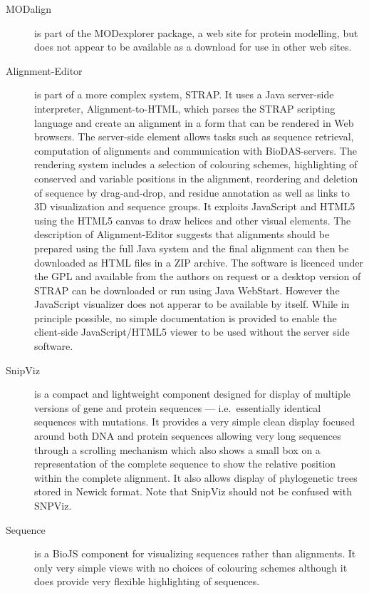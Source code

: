 \documentclass[a4]{article}
\begin{document}
\begin{description}
\item[MODalign] is part of the MODexplorer
  package\cite{kosinski:2013}, a web site for protein modelling, but
  does not appear to be available as a download for use in other web
  sites.
\item[Alignment-Editor] is part of a more complex system, STRAP. It
  uses a Java server-side interpreter,
  Alignment-to-HTML\cite{gille:2014}, which parses the STRAP scripting
  language and create an alignment in a form that can be rendered in
  Web browsers. The server-side element allows tasks such as sequence
  retrieval, computation of alignments and communication with
  BioDAS-servers. The rendering system includes a selection of
  colouring schemes, highlighting of conserved and variable positions
  in the alignment, reordering and deletion of sequence by
  drag-and-drop, and residue annotation as well as links to 3D
  visualization and sequence groups. It exploits JavaScript and HTML5
  using the HTML5 canvas to draw helices and other visual elements.
  The description of Alignment-Editor\cite{gille:2014aa} suggests that
  alignments should be prepared using the full Java system and the
  final alignment can then be downloaded as HTML files in a ZIP
  archive. The software is licenced under the GPL and available from
  the authors on request or a desktop version of STRAP can be
  downloaded or run using Java WebStart. However the JavaScript
  visualizer does not apperar to be available by itself. While in
  principle possible, no simple documentation is provided to enable
  the client-side JavaScript/HTML5 viewer to be used without the
  server side software.
\item[SnipViz] is a compact and lightweight component designed for
  display of multiple versions of gene and protein sequences --- i.e.\
  essentially identical sequences with mutations.  It provides a very
  simple clean display focused around both DNA and protein sequences
  allowing very long sequences through a scrolling mechanism which
  also shows a small box on a representation of the complete sequence
  to show the relative position within the complete alignment.  It
  also allows display of phylogenetic trees stored in Newick
  format. Note that SnipViz should not be confused with
  SNPViz\cite{langewisch:snpviz}.
\item[Sequence] is a BioJS component for visualizing sequences rather
  than alignments.  It only very simple views with no choices of
  colouring schemes although it does provide very flexible
  highlighting of sequences.
\end{description}
\end{document}
